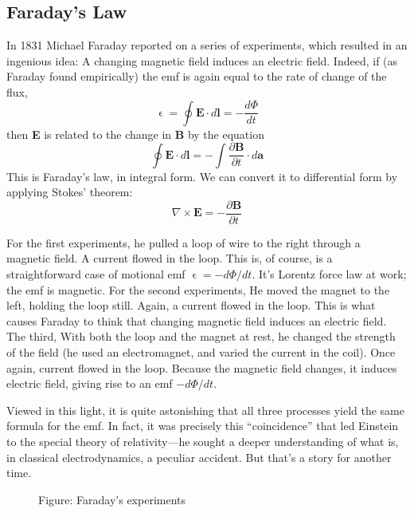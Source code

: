 \documentclass[../../../main.tex]{subfiles}
\begin{document}
\subsection*{Faraday's Law}
In 1831 Michael Faraday reported on a series of experiments, which resulted in an ingenious idea: A changing magnetic ﬁeld induces an electric ﬁeld. Indeed, if (as Faraday found empirically) the emf is again equal to the rate of change of the ﬂux,
\begin{equation*}
    \upvarepsilon=\oint \mathbf{E}\cdot d\mathbf{l}=-\frac{d\Phi}{dt}
\end{equation*}
then \textbf{E} is related to the change in \textbf{B} by the equation
\begin{equation*}
    \oint \mathbf{E}\cdot d\mathbf{l}=-\int \frac{\partial \mathbf{B}}{\partial t}\cdot d\mathbf{a}
\end{equation*}
This is Faraday's law, in integral form. We can convert it to differential form by 
applying Stokes' theorem:
\begin{equation*}
    \nabla\times \mathbf{E}=-\frac{\partial \mathbf{B}}{\partial t}
\end{equation*}

For the first experiments, he pulled a loop of wire to the right through a magnetic ﬁeld. A current ﬂowed in the loop. This is, of course, is a straightforward case of motional emf $\upvarepsilon=-d\Phi/dt$. It’s  Lorentz force law at work; the emf is magnetic. For the second experiments, He moved the magnet to the left, holding the loop still. Again, a current ﬂowed in the loop. This is what causes Faraday to think that changing magnetic ﬁeld induces an electric ﬁeld. The third, With both the loop and the magnet at rest, he changed the strength of the ﬁeld (he used an electromagnet, and varied the current 
in the coil). Once again, current ﬂowed in the loop. Because the magnetic field changes, it induces electric field, giving rise to an emf $-d\Phi/dt$. 

Viewed in this light, it is quite astonishing that all three processes yield the same formula for the emf. In fact, it was precisely this “coincidence” that led Einstein to the special theory of relativity—he sought a deeper understanding of what is, in classical electrodynamics, a peculiar accident. But that’s a story for another time.
\begin{figure*}[b]
    \centering
    \caption*{Figure: Faraday's experiments}
\end{figure*}
\end{document}
